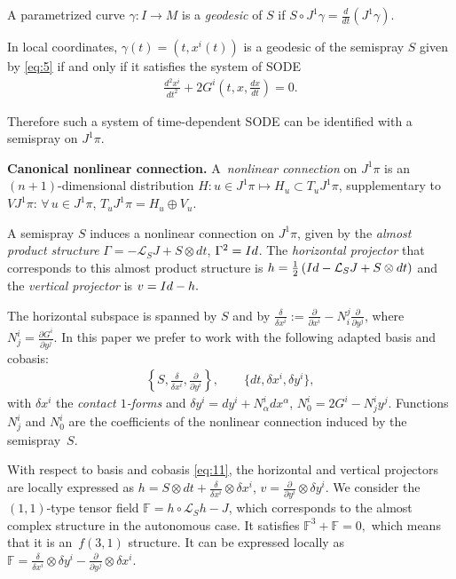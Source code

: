 \documentclass[11pt]{article}
\begin{document}
A parametrized curve $\gamma:  I\rightarrow M$ is a \emph{geodesic}
of $S$ if $S\circ J^{1}\gamma=\frac{d}{dt}(J^{1}\gamma).$

In local coordinates, $\gamma(t)=(t,x^{i}(t))$ is a geodesic of the
semispray $S$ given by \eqref{eq:5} if and only if it satisf\/ies
the system of SODE \begin{gather}
\frac{d^{2}x^{i}}{dt^{2}}+2G^{i}\left(t,x,\frac{dx}{dt}\right)=0.\label{sode}
\end{gather}


Therefore such a system of time-dependent SODE can be identif\/ied with
a semispray on $J^{1}\pi$.

{\bf Canonical nonlinear connection.}
A~\emph{nonlinear connection} on $J^{1}\pi$ is an $(n+1)$-dimensional
distribution $H:u\in J^{1}\pi\mapsto H_{u}\subset T_{u}J^{1}\pi$,
supplementary to $VJ^{1}\pi$: $\forall\, u\in J^{1}\pi$, $T_{u}J^{1}\pi=H_{u}\oplus V_{u}$.

A semispray $S$ induces a nonlinear connection on $J^{1}\pi$, given
by the \emph{almost product structure} $\Gamma=-\mathcal{L}_{S}J+S\otimes dt$, $\Gamma^{2}={\rm Id}$.
The \emph{horizontal projector} that corresponds to this almost product
structure is $h=\frac{1}{2}\left({\rm Id}-\mathcal{L}_{S}J+S\otimes dt\right)$
and the \emph{vertical projector} is $v={\rm Id}-h.$

The horizontal subspace is spanned by $S$ and by $\frac{\delta}{\delta x^{i}}:=\frac{\partial}{\partial x^{i}}-N_{i}^{j}\frac{\partial}{\partial y^{j}}$, where $N_{j}^{i}=\frac{\partial G^{i}}{\partial y^{j}}$.
In this paper we prefer to work with the following adapted basis and
cobasis:
\begin{gather}
\left\{ S,\frac{\delta}{\delta x^{i}},\frac{\partial}{\partial y^{i}}\right\} ,\qquad\{dt,\delta x^{i},\delta y^{i}\},\label{eq:11}
\end{gather}
 with $\delta x^{i}$ the \emph{contact $1$-forms} and $\delta y^{i}=dy^{i}+N_{\alpha}^{i}dx^{\alpha}$, $N_{0}^{i}=2G^{i}-N_{j}^{i}y^{j}$.
Functions $N_{j}^{i}$ and $N_{0}^{i}$ are the coef\/f\/icients of the
nonlinear connection induced by the semispray~$S$.

With respect to basis and cobasis \eqref{eq:11}, the horizontal and
vertical projectors are locally expressed as $h=S\otimes dt+\frac{\delta}{\delta x^{i}}\otimes\delta x^{i}$, $v=\frac{\partial}{\partial y^{i}}\otimes\delta y^{i}$.
We consider the $(1,1)$-type tensor f\/ield $\mathbb{F}=h\circ\mathcal{L}_{S}h-J$,
which corresponds to the almost complex structure in the autonomous
case. It satisf\/ies $\mathbb{F}^{3}+\mathbb{F}=0,$ which means that
it is an~$f(3,1)$ structure. It can be expressed locally as $\mathbb{F}=\frac{\delta}{\delta x^{i}}\otimes\delta y^{i}-\frac{\partial}{\partial y^{j}}\otimes\delta x^{i}$.
\end{document}
